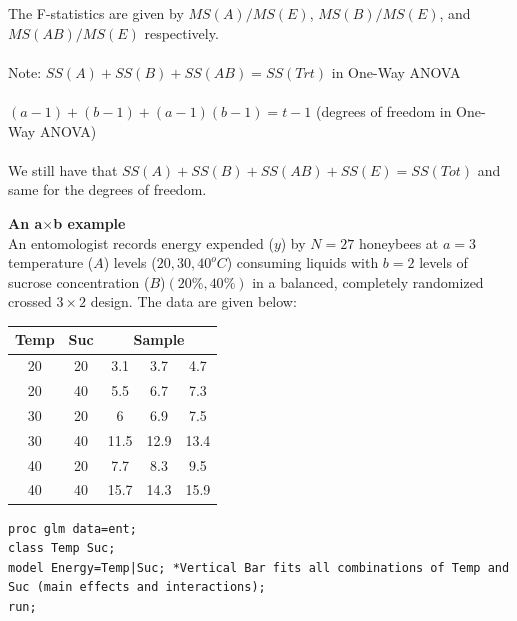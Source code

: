 The F-statistics are given by $MS(A)/MS(E)$, $MS(B)/MS(E)$, and $MS(AB)/MS(E)$ respectively.  \\~\\
Note: $SS(A)+SS(B)+SS(AB) = SS(Trt)$ in One-Way ANOVA\\~\\
$(a-1)+(b-1)+(a-1)(b-1)=t-1$ (degrees of freedom in One-Way ANOVA)\\~\\
We still have that $SS(A)+SS(B)+SS(AB)+SS(E)=SS(Tot)$ and same for the degrees of freedom.

\newpage

\textbf{An a$\times$b example}\\
An entomologist records energy expended ($y$) by $N=27$ honeybees at $a=3$ temperature ($A$) levels ($20,30,40^o C$) consuming liquids with $b=2$ levels of sucrose concentration ($B$)$(20\%,40\%)$ in a balanced, completely randomized crossed $3 \times 2$ design.  The data are given below:
\begin{center}
\begin{tabular}{|cc|ccc|}  \hline
Temp & Suc & \multicolumn{3}{c|}{Sample} \\ \hline
   20 & 20 & 3.1 & 3.7 & 4.7 \\
   20 & 40 & 5.5 & 6.7 & 7.3 \\
   30 & 20 & 6 & 6.9 & 7.5 \\
   30 & 40 & 11.5 & 12.9 & 13.4 \\
   40 & 20 & 7.7 & 8.3 & 9.5 \\
   40 & 40 & 15.7 & 14.3 & 15.9 \\\hline
\end{tabular}
\end{center}

\begin{small}
\begin{verbatim}
proc glm data=ent;
class Temp Suc;
model Energy=Temp|Suc; *Vertical Bar fits all combinations of Temp and Suc (main effects and interactions);
run;
\end{verbatim}
\end{small}

